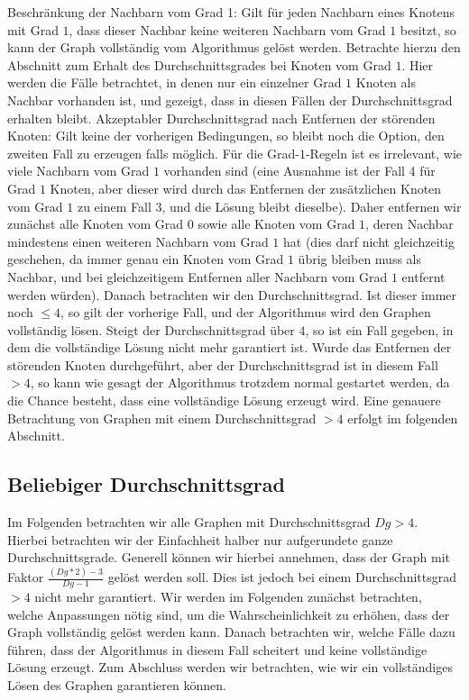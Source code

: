 \documentclass[12pt,onecolumn, notitlepage]{scrartcl}
\begin{document}
Beschränkung der Nachbarn vom Grad 1:\newline
Gilt für jeden Nachbarn eines Knotens mit Grad $1$, dass dieser Nachbar keine weiteren Nachbarn vom Grad $1$ besitzt, so kann der Graph vollständig vom Algorithmus gelöst werden. Betrachte hierzu den Abschnitt zum Erhalt des Durchschnittsgrades bei Knoten vom Grad $1$. Hier werden die Fälle betrachtet, in denen nur ein einzelner Grad $1$ Knoten als Nachbar vorhanden ist, und gezeigt, dass in diesen Fällen der Durchschnittsgrad erhalten bleibt.\newline\newline
Akzeptabler Durchschnittsgrad nach Entfernen der störenden Knoten:\newline
Gilt keine der vorherigen Bedingungen, so bleibt noch die Option, den zweiten Fall zu erzeugen falls möglich. Für die Grad-$1$-Regeln ist es irrelevant, wie viele Nachbarn vom Grad $1$ vorhanden sind (eine Ausnahme ist der Fall 4 für Grad $1$ Knoten, aber dieser wird durch das Entfernen der zusätzlichen Knoten vom Grad $1$ zu einem Fall 3, und die Lösung bleibt dieselbe). Daher entfernen wir zunächst alle Knoten vom Grad $0$ sowie alle Knoten vom Grad $1$, deren Nachbar mindestens einen weiteren Nachbarn vom Grad $1$ hat (dies darf nicht gleichzeitig geschehen, da immer genau ein Knoten vom Grad $1$ übrig bleiben muss als Nachbar, und bei gleichzeitigem Entfernen aller Nachbarn vom Grad $1$ entfernt werden würden). Danach betrachten wir den Durchschnittsgrad. Ist dieser immer noch $\leq 4$, so gilt der vorherige Fall, und der Algorithmus wird den Graphen vollständig lösen. Steigt der Durchschnittsgrad über $4$, so ist ein Fall gegeben, in dem die vollständige Lösung nicht mehr garantiert ist.\newline\newline
Wurde das Entfernen der störenden Knoten durchgeführt, aber der Durchschnittsgrad ist in diesem Fall $> 4$, so kann wie gesagt der Algorithmus trotzdem normal gestartet werden, da die Chance besteht, dass eine vollständige Lösung erzeugt wird. Eine genauere Betrachtung von Graphen mit einem Durchschnittsgrad $> 4$ erfolgt im folgenden Abschnitt.\newline\newline
\subsection{Beliebiger Durchschnittsgrad}
Im Folgenden betrachten wir alle Graphen mit Durchschnittsgrad $Dg > 4$. Hierbei betrachten wir der Einfachheit halber nur aufgerundete ganze Durchschnittsgrade. Generell können wir hierbei annehmen, dass der Graph mit Faktor $\frac{(Dg * 2) - 3}{Dg - 1}$ gelöst werden soll. Dies ist jedoch bei einem Durchschnittsgrad $> 4$ nicht mehr garantiert. Wir werden im Folgenden zunächst betrachten, welche Anpassungen nötig sind, um die Wahrscheinlichkeit zu erhöhen, dass der Graph vollständig gelöst werden kann. Danach betrachten wir, welche Fälle dazu führen, dass der Algorithmus in diesem Fall scheitert und keine vollständige Lösung erzeugt. Zum Abschluss werden wir betrachten, wie wir ein vollständiges Lösen des Graphen garantieren können. \newline
\end{document}
